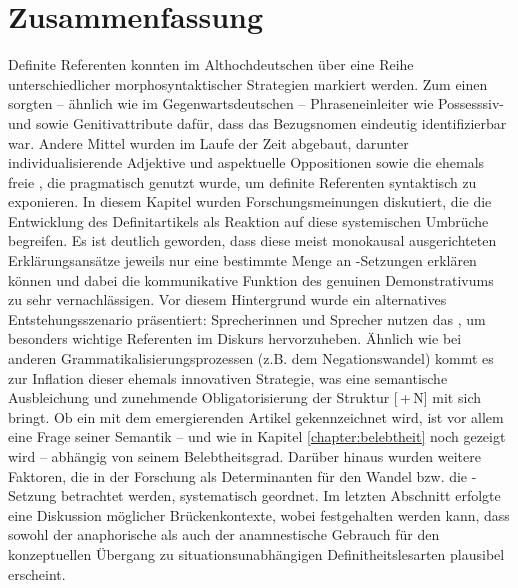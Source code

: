 \section{Zusammenfassung}
Definite Referenten konnten im Althochdeutschen über eine Reihe unterschiedlicher morphosyntaktischer Strategien markiert werden. Zum einen sorgten -- ähnlich wie im Gegenwartsdeutschen -- Phraseneinleiter wie Possesssiv-  und  sowie Genitivattribute  dafür, dass das Bezugsnomen eindeutig identifizierbar war. Andere Mittel wurden im Laufe der Zeit abgebaut, darunter individualisierende Adjektive  und aspektuelle  Oppositionen sowie die ehemals freie , die pragmatisch genutzt wurde, um definite Referenten syntaktisch zu exponieren. In diesem Kapitel wurden Forschungsmeinungen diskutiert, die die Entwicklung des Definitartikels  als Reaktion auf diese systemischen Umbrüche begreifen. Es ist deutlich geworden, dass diese meist monokausal ausgerichteten Erklärungsansätze jeweils nur eine bestimmte Menge an -Setzungen erklären können und dabei die kommunikative Funktion des genuinen Demonstrativums  zu sehr vernachlässigen. Vor diesem Hintergrund wurde ein alternatives Entstehungsszenario präsentiert: Sprecherinnen und Sprecher nutzen das , um besonders wichtige Referenten im Diskurs hervorzuheben. Ähnlich wie bei anderen Grammatikalisierungsprozessen  (z.B. dem Negationswandel) kommt es zur Inflation dieser ehemals innovativen Strategie, was eine semantische Ausbleichung und zunehmende Obligatorisierung der Struktur [\,+\,N] mit sich bringt. Ob ein  mit dem emergierenden Artikel gekennzeichnet wird, ist vor allem eine Frage seiner Semantik -- und wie in Kapitel \ref{chapter:belebtheit} noch gezeigt wird -- abhängig von seinem  Belebtheitsgrad. Darüber hinaus wurden weitere Faktoren, die in der Forschung als Determinanten für den Wandel bzw. die -Setzung betrachtet werden, systematisch geordnet. Im letzten Abschnitt erfolgte eine Diskussion möglicher  Brückenkontexte, wobei festgehalten werden kann, dass sowohl der anaphorische  als auch der anamnestische  Gebrauch für den konzeptuellen Übergang zu situationsunabhängigen Definitheitslesarten plausibel erscheint. 
